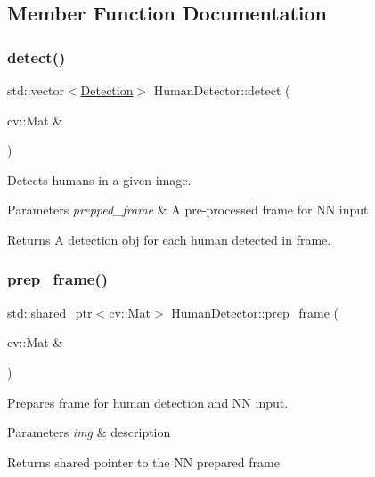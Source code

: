 \subsection{Member Function Documentation}
\mbox{\label{class_human_detector_acd632914e98da1a05d80270b769cfdd3}} 
\subsubsection{\texorpdfstring{detect()}{detect()}}
{\footnotesize\ttfamily std\+::vector$<$\hyperlink{struct_detection}{Detection}$>$ Human\+Detector\+::detect (\begin{DoxyParamCaption}\item[{cv\+::\+Mat \&}]{ }\end{DoxyParamCaption})}



Detects humans in a given image. 


\begin{DoxyParams}{Parameters}
{\em prepped\+\_\+frame} & A pre-\/processed frame for NN input \\
\hline
\end{DoxyParams}
\begin{DoxyReturn}{Returns}
A detection obj for each human detected in frame. 
\end{DoxyReturn}
\mbox{\label{class_human_detector_abb95c995b5b11c93103484f0fc9027c5}} 
\subsubsection{\texorpdfstring{prep\+\_\+frame()}{prep\_frame()}}
{\footnotesize\ttfamily std\+::shared\+\_\+ptr$<$cv\+::\+Mat$>$ Human\+Detector\+::prep\+\_\+frame (\begin{DoxyParamCaption}\item[{cv\+::\+Mat \&}]{ }\end{DoxyParamCaption})}



Prepares frame for human detection and NN input. 


\begin{DoxyParams}{Parameters}
{\em img} & description \\
\hline
\end{DoxyParams}
\begin{DoxyReturn}{Returns}
shared pointer to the NN prepared frame 
\end{DoxyReturn}


